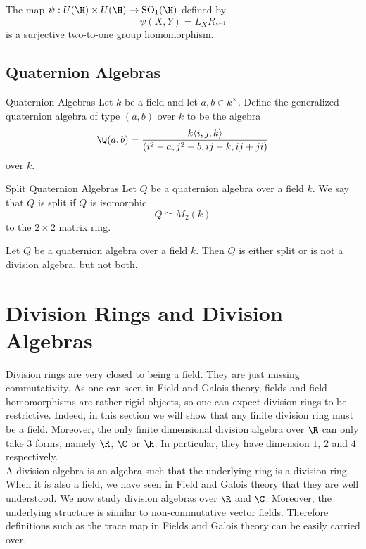 \documentclass[a4paper]{article}
\begin{document}
\begin{thm}{}{} The map $\psi:U(\H)\times U(\H)\to\text{SO}_1(\H)$ defined by $$\psi(X,Y)=L_XR_{Y^{-1}}$$ is a surjective two-to-one group homomorphism. 
\end{thm}

\subsection{Quaternion Algebras}
\begin{defn}{Quaternion Algebras}{} Let $k$ be a field and let $a,b\in k^\times$. Define the generalized quaternion algebra of type $(a,b)$ over $k$ to be the algebra $$\Q(a,b)=\frac{k\langle i,j,k\rangle}{(i^2-a,j^2-b,ij-k,ij+ji)}$$ over $k$. 
\end{defn}

\begin{defn}{Split Quaternion Algebras}{} Let $Q$ be a quaternion algebra over a field $k$. We say that $Q$ is split if $Q$ is isomorphic $$Q\cong M_2(k)$$ to the $2\times 2$ matrix ring. 
\end{defn}

\begin{thm}{}{} Let $Q$ be a quaternion algebra over a field $k$. Then $Q$ is either split or is not a division algebra, but not both. 
\end{thm}

\pagebreak
\section{Division Rings and Division Algebras}
Division rings are very closed to being a field. They are just missing commutativity. As one can seen in Field and Galois theory, fields and field homomorphisms are rather rigid objects, so one can expect division rings to be restrictive. Indeed, in this section we will show that any finite division ring must be a field. Moreover, the only finite dimensional division algebra over $\R$ can only take $3$ forms, namely $\R$, $\C$ or $\H$. In particular, they have dimension $1$, $2$ and $4$ respectively. \\

A division algebra is an algebra such that the underlying ring is a division ring. When it is also a field, we have seen in Field and Galois theory that they are well understood. We now study division algebras over $\R$ and $\C$. Moreover, the underlying structure is similar to non-commutative vector fields. Therefore definitions such as the trace map in Fields and Galois theory can be easily carried over. 
\end{document}
